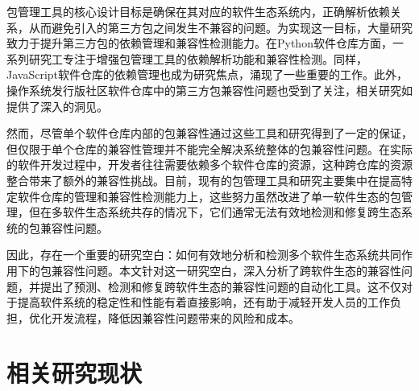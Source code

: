 包管理工具的核心设计目标是确保在其对应的软件生态系统内，正确解析依赖关系，从而避免引入的第三方包之间发生不兼容的问题。为实现这一目标，大量研究致力于提升第三方包的依赖管理和兼容性检测能力。在Python软件仓库方面，一系列研究工专注于增强包管理工具的依赖解析功能和兼容性检测。同样，JavaScript软件仓库的依赖管理也成为研究焦点，涌现了一些重要的工作。此外，操作系统发行版社区软件仓库中的第三方包兼容性问题也受到了关注，相关研究如提供了深入的洞见。

然而，尽管单个软件仓库内部的包兼容性通过这些工具和研究得到了一定的保证，但仅限于单个仓库的兼容性管理并不能完全解决系统整体的包兼容性问题。在实际的软件开发过程中，开发者往往需要依赖多个软件仓库的资源，这种跨仓库的资源整合带来了额外的兼容性挑战。目前，现有的包管理工具和研究主要集中在提高特定软件仓库的管理和兼容性检测能力上，这些努力虽然改进了单一软件生态的包管理，但在多软件生态系统共存的情况下，它们通常无法有效地检测和修复跨生态系统的包兼容性问题。

因此，存在一个重要的研究空白：如何有效地分析和检测多个软件生态系统共同作用下的包兼容性问题。本文针对这一研究空白，深入分析了跨软件生态的兼容性问题，并提出了预测、检测和修复跨软件生态的兼容性问题的自动化工具\tool{}。这不仅对于提高软件系统的稳定性和性能有着直接影响，还有助于减轻开发人员的工作负担，优化开发流程，降低因兼容性问题带来的风险和成本。


\section{相关研究现状}
